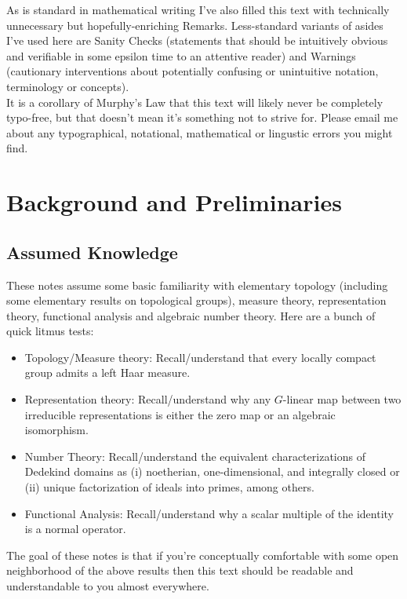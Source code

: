 \documentclass[11pt, x11names]{book}
\begin{document}
As is standard in mathematical writing I've also filled this text with technically unnecessary but hopefully-enriching Remarks. Less-standard variants of asides I've used here are Sanity Checks (statements that should be intuitively obvious and verifiable in some epsilon time to an attentive reader) and Warnings (cautionary interventions about potentially confusing or unintuitive notation, terminology or concepts).\\

It is a corollary of Murphy's Law that this text will likely never be completely typo-free, but that doesn't mean it's something not to strive for. Please email me about any typographical, notational, mathematical or lingustic errors you might find.



\newpage

\chapter{Background and Preliminaries}

\section*{Assumed Knowledge}

These notes assume some basic familiarity with elementary topology (including some elementary results on topological groups), measure theory, representation theory, functional analysis and algebraic number theory. Here are a bunch of quick litmus tests:
\begin{itemize}
    \item Topology/Measure theory: Recall/understand that every locally compact group admits a left Haar measure.
    \item Representation theory: Recall/understand why any $G$-linear map between two irreducible representations is either the zero map or an algebraic isomorphism.
    \item Number Theory: Recall/understand the equivalent characterizations of Dedekind domains as (i) noetherian, one-dimensional, and integrally closed or (ii) unique factorization of ideals into primes, among others.
    \item Functional Analysis: Recall/understand why a scalar multiple of the identity is a normal operator.
\end{itemize}
The goal of these notes is that if you're conceptually comfortable with some open neighborhood of the above results then this text should be readable and understandable to you almost everywhere.
\end{document}

